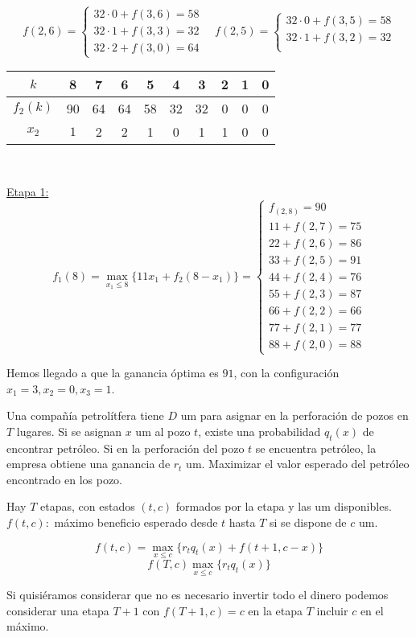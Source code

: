 \documentclass[twoside]{article}
\begin{document}
\begin{ejercicio}{2}
\begin{solucion}
$$f(2,6)=\begin{cases}
32\cdot 0+f(3,6)=58\\
32\cdot 1+f(3,3)=32\\
32\cdot 2+f(3,0)=64
\end{cases}\quad f(2,5)=\begin{cases}
32\cdot 0+f(3,5)=58\\
32\cdot 1+f(3,2)=32\\
\end{cases}$$
\begin{center}
\begin{tabular}{c| c c c c c c c c c}
$k$ & 8 & 7 & 6 & 5 & 4 & 3 & 2 & 1 & 0\\
\hline
$f_2(k)$ & 90 & 64 & 64 & 58 & 32 & 32 & 0 & 0 & 0\\
$x_2$ &  $1$ & 2 & 2 &    1&  0 & 1 &   1 & 0 & 0
\end{tabular}\
\end{center}
\underline{Etapa 1:}
$$f_1(8)=\max_{x_1\leq 8}\{11x_1+f_2(8-x_1)\}=\begin{cases}
f_(2,8)=90\\
11+f(2,7)=75\\
22+f(2,6)=86\\
33+f(2,5)=\boxed{91}\\
44+f(2,4)=76\\
55+f(2,3)=87\\
66+f(2,2)=66\\
77+f(2,1)=77\\
88+f(2,0)=88
\end{cases}$$

Hemos llegado a que la ganancia óptima es $91$, con la configuración $x_1=3,x_2=0, x_3=1$.
\end{solucion}

\end{ejercicio}

\newpage 
\begin{ejercicio}{3}
Una compañía petrolítfera tiene $D$ um para asignar en la perforación de pozos en $T$ lugares. Si se asignan $x$ um al pozo $t$, existe una probabilidad $q_t(x)$ de encontrar petróleo. Si en la perforación del pozo $t$ se encuentra petróleo, la empresa obtiene una ganancia de $r_t$ um. Maximizar el valor esperado del petróleo encontrado en los pozo.
\begin{solucion}
Hay $T$ etapas, con estados $(t,c)$ formados por la etapa y las um disponibles. $f(t,c):$ máximo beneficio esperado desde $t$ hasta $T$ si se dispone de $c$ um. 

$$f(t,c)=\max_{x\leq c}\{r_tq_t(x)+f(t+1,c-x)\}$$
$$f(T,c)\max_{x\leq c}\{r_tq_t(x)\}$$

Si quisiéramos considerar que no es necesario invertir todo el dinero podemos considerar una etapa $T+1$ con $f(T+1,c)=c$ en la etapa $T$ incluir $c$ en el máximo. 







\end{solucion}
\end{ejercicio}	
\end{document}
